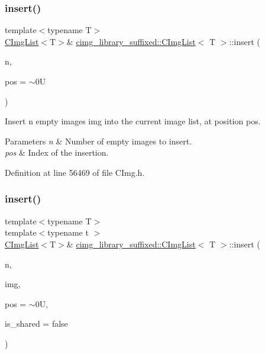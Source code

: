 \subsubsection{\texorpdfstring{insert()}{insert()}\hspace{0.1cm}{\footnotesize\ttfamily [2/5]}}
{\footnotesize\ttfamily template$<$typename T$>$ \\
\hyperlink{structcimg__library__suffixed_1_1CImgList}{C\+Img\+List}$<$T$>$\& \hyperlink{structcimg__library__suffixed_1_1CImgList}{cimg\+\_\+library\+\_\+suffixed\+::\+C\+Img\+List}$<$ T $>$\+::insert (\begin{DoxyParamCaption}\item[{const unsigned int}]{n,  }\item[{const unsigned int}]{pos = {\ttfamily $\sim$0U} }\end{DoxyParamCaption})\hspace{0.3cm}{\ttfamily [inline]}}



Insert n empty images img into the current image list, at position {\ttfamily pos}. 


\begin{DoxyParams}{Parameters}
{\em n} & Number of empty images to insert. \\
\hline
{\em pos} & Index of the insertion. \\
\hline
\end{DoxyParams}


Definition at line 56469 of file C\+Img.\+h.

\mbox{\label{structcimg__library__suffixed_1_1CImgList_a87ff890dcd5acf1eafb37fbf0c298b03}} 
\subsubsection{\texorpdfstring{insert()}{insert()}\hspace{0.1cm}{\footnotesize\ttfamily [3/5]}}
{\footnotesize\ttfamily template$<$typename T$>$ \\
template$<$typename t $>$ \\
\hyperlink{structcimg__library__suffixed_1_1CImgList}{C\+Img\+List}$<$T$>$\& \hyperlink{structcimg__library__suffixed_1_1CImgList}{cimg\+\_\+library\+\_\+suffixed\+::\+C\+Img\+List}$<$ T $>$\+::insert (\begin{DoxyParamCaption}\item[{const unsigned int}]{n,  }\item[{const \hyperlink{structcimg__library__suffixed_1_1CImg}{C\+Img}$<$ t $>$ \&}]{img,  }\item[{const unsigned int}]{pos = {\ttfamily $\sim$0U},  }\item[{const bool}]{is\+\_\+shared = {\ttfamily false} }\end{DoxyParamCaption})\hspace{0.3cm}{\ttfamily [inline]}}



